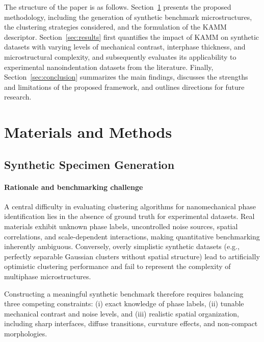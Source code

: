 \documentclass[final,3p,times]{elsarticle}
\begin{document}
The structure of the paper is as follows. Section~\ref{sec:methods} presents the proposed methodology, including the generation of synthetic benchmark microstructures, the clustering strategies considered, and the formulation of the KAMM descriptor. Section~\ref{sec:results} first quantifies the impact of KAMM on synthetic datasets with varying levels of mechanical contrast, interphase thickness, and microstructural complexity, and subsequently evaluates its applicability to experimental nanoindentation datasets from the literature. Finally, Section~\ref{sec:conclusion} summarizes the main findings, discusses the strengths and limitations of the proposed framework, and outlines directions for future research.

\section{Materials and Methods}
\label{sec:methods}

\subsection{Synthetic Specimen Generation}
\label{sec:synthetic_specimens}

\paragraph{Rationale and benchmarking challenge}

A central difficulty in evaluating clustering algorithms for nanomechanical phase identification lies in the absence of ground truth for experimental datasets. Real materials exhibit unknown phase labels, uncontrolled noise sources, spatial correlations, and scale-dependent interactions, making quantitative benchmarking inherently ambiguous. Conversely, overly simplistic synthetic datasets (e.g., perfectly separable Gaussian clusters without spatial structure) lead to artificially optimistic clustering performance and fail to represent the complexity of multiphase microstructures.

Constructing a meaningful synthetic benchmark therefore requires balancing three competing constraints:
(i) exact knowledge of phase labels,
(ii) tunable mechanical contrast and noise levels,
and (iii) realistic spatial organization, including sharp interfaces, diffuse transitions, curvature effects, and non-compact morphologies.
\end{document}
